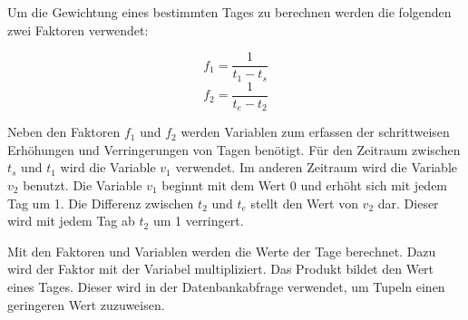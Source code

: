 Um die Gewichtung eines bestimmten Tages zu berechnen werden die folgenden zwei Faktoren verwendet:

\begin{equation}
f_1 = \frac{1}{t_1 - t_{s}}
\end{equation}
\begin{equation}
f_2 = \frac{1}{t_{e} - t_2}
\end{equation}

Neben den Faktoren $f_1$ und $f_2$ werden Variablen zum erfassen der schrittweisen Erhöhungen und Verringerungen von Tagen benötigt. Für den Zeitraum zwischen   
$t_{s}$ und $t_{1}$ wird die Variable $v_{1}$ verwendet. Im anderen Zeitraum wird die Variable $v_{2}$ benutzt. Die Variable $v_{1}$ beginnt mit dem Wert 0 und erhöht sich mit jedem Tag um 1. Die Differenz zwischen $t_{2}$ und $t_{e}$ stellt den Wert von $v_{2}$ dar. Dieser wird mit jedem Tag ab $t_{2}$ um 1 verringert.

Mit den Faktoren und Variablen werden die Werte der Tage berechnet. Dazu wird der Faktor mit der Variabel multipliziert. Das Produkt bildet den Wert eines Tages. Dieser wird in der Datenbankabfrage verwendet, um Tupeln einen geringeren Wert zuzuweisen. 

